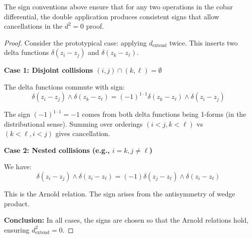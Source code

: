 \begin{lemma}\label{lem:cobar-sign-consistency}
The sign conventions above ensure that for any two operations in the cobar differential, 
the double application produces consistent signs that allow cancellations in the 
$d^2 = 0$ proof.
\end{lemma}

\begin{proof}
Consider the prototypical case: applying $d_{\text{extend}}$ twice. This inserts 
two delta functions $\delta(z_i - z_j)$ and $\delta(z_k - z_\ell)$.

\textbf{Case 1: Disjoint collisions $(i,j) \cap (k,\ell) = \emptyset$}

The delta functions commute with sign:
$$\delta(z_i - z_j) \wedge \delta(z_k - z_\ell) = (-1)^{1 \cdot 1} \delta(z_k - z_\ell) 
\wedge \delta(z_i - z_j)$$

The sign $(-1)^{1 \cdot 1} = -1$ comes from both delta functions being 1-forms 
(in the distributional sense). Summing over orderings $(i<j, k<\ell)$ vs $(k<\ell, i<j)$ 
gives cancellation.

\textbf{Case 2: Nested collisions (e.g., $i=k, j \neq \ell$)}

We have:
$$\delta(z_i - z_j) \wedge \delta(z_i - z_\ell) = (-1) \delta(z_j - z_\ell) 
\wedge \delta(z_i - z_\ell)$$

This is the Arnold relation. The sign arises from the antisymmetry of wedge product.

\textbf{Conclusion:} In all cases, the signs are chosen so that the Arnold relations 
hold, ensuring $d_{\text{extend}}^2 = 0$.
\end{proof}

